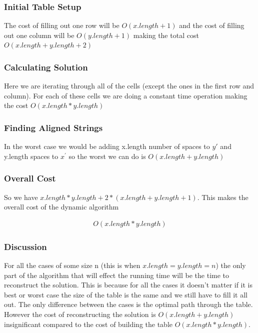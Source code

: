 \documentclass{article}
\begin{document}
					\subsubsection{Initial Table Setup}
						The cost of filling out one row will be $O(x.length + 1)$ and the cost of filling out one column will be $O(y.length + 1)$ making the total cost $O(x.length + y.length + 2)$
						
					\subsubsection{Calculating Solution}
						Here we are iterating through all of the cells (except the ones in the first row and column). For each of these cells we are doing a constant time operation making the cost $O(x.length * y.length)$
						
					\subsubsection{Finding Aligned Strings}
						In the worst case we would be adding x.length number of spaces to $y\prime$ and y.length spaces to $x^\prime$ so the worst we can do is $O(x.length + y.length)$
						
					\subsubsection{Overall Cost}
						So we have $x.length * y.length + 2*(x.length + y.length + 1)$. This makes the overall cost of the dynamic algorithm
						
						\begin{align*}
  							O(x.length * y.length)
  						\end{align*}
  						
  					\subsubsection{Discussion}
  						For all the cases of some size n (this is when $x.length = y.length = n$) the only part of the algorithm that will effect the running time will be the time to reconstruct the solution. This is because for all the cases it doesn't matter if it is best or worst case the size of the table is the same and we still have to fill it all out. The only difference between the cases is the optimal path through the table. However the cost of reconstructing the solution is $O(x.length + y.length)$ insignificant compared to the cost of building the table $O(x.length * y.length)$.
  						
\end{document}
